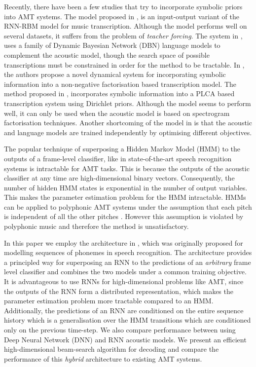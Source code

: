 \documentclass{article}
\begin{document}
Recently, there have been a few studies that try to incorporate symbolic priors into AMT systems. The model proposed in \cite{boulanger2013high}, is an input-output variant of the RNN-RBM model for music transcription. Although the model performs well on several datasets, it suffers from the problem of \emph{teacher forcing}. The system in \cite{raczynski2013dynamic}, uses a family of Dynamic Bayesian Network (DBN) language models to complement the acoustic model, though the search space of possible transcriptions must be constrained in order for the method to be tractable. In \cite{simsekli2013hierarchical}, the authors propose a novel dynamical system for incorporating symbolic information into a non-negative factorisation based transcription model. The method proposed in \cite{sigtiarnn}, incorporates symbolic information into a PLCA based transcription system using Dirichlet priors. Although the model seems to perform well, it can only be used when the acoustic model is based on spectrogram factorisation 
techniques. Another shortcoming of the model in \cite{sigtiarnn} is that the acoustic and language models are trained independently by optimising different objectives. 

The popular technique of superposing a Hidden Markov Model (HMM) to the outputs of a frame-level classifier, like in state-of-the-art speech recognition systems \cite{hinton2012deep} is intractable for AMT tasks. This is because the outputs of the acoustic classifier at any time are high-dimensional binary vectors. Consequently, the number of hidden HMM states is exponential in the number of output variables. This makes the parameter estimation problem for the HMM intractable. HMMs can be applied to polyphonic AMT systems under the assumption that each pitch is independent of all the other pitches \cite{poliner2006discriminative}. However this assumption is violated by polyphonic music and therefore the method is unsatisfactory. 

In this paper we employ the architecture in \cite{boulangerphone}, which was originally proposed for modelling sequences of phonemes in speech recognition. The architecture provides a principled way for superposing an RNN to the predictions of an \emph{arbitrary} frame level classifier and combines the two models under a common training objective. It is advantageous to use RNNs for high-dimensional problems like AMT, since the outputs of the RNN form a distributed representation, which makes the parameter estimation problem more tractable compared to an HMM. Additionally, the predictions of an RNN are conditioned on the entire sequence history which is a generalisation over the HMM transitions which are conditioned only on the previous time-step. We also compare performance between using Deep Neural Network (DNN) and RNN acoustic models. We present an efficient high-dimensional beam-search algorithm for decoding and compare the performance of this \emph{hybrid} architecture to existing AMT systems.
\end{document}

